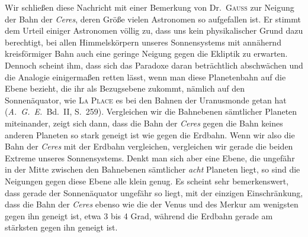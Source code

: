 %
Wir schließen diese Nachricht mit einer Bemerkung von Dr.\ \textsc{Gauss} zur Neigung der Bahn der \textit{Ceres}, deren Größe vielen Astronomen so aufgefallen ist. Er stimmt dem Urteil einiger Astronomen völlig zu, dass uns kein physikalischer Grund dazu berechtigt, bei allen Himmelskörpern unseres Sonnensystems mit annähernd kreisförmiger Bahn auch eine geringe Neigung gegen die Ekliptik zu erwarten. Dennoch scheint ihm, dass sich das Paradoxe daran beträchtlich abschwächen und die Analogie einigermaßen retten lässt, wenn man diese Planetenbahn auf die Ebene bezieht, die ihr als Bezugsebene zukommt, nämlich auf den Sonnenäquator, wie \textsc{La Place} es bei den Bahnen der Uranusmonde getan hat (\textit{A.\ G.\ E.}\ Bd.\ II, S.\ 259). Vergleichen wir die Bahnebenen sämtlicher Planeten miteinander, zeigt sich dann, dass die Bahn der \textit{Ceres} gegen die Bahn keines anderen Planeten so stark geneigt ist wie gegen die Erdbahn. Wenn wir also die Bahn der \textit{Ceres} mit der Erdbahn vergleichen, vergleichen wir gerade die beiden Extreme unseres Sonnensystems. Denkt man sich aber eine Ebene, die ungefähr in der Mitte zwischen den Bahnebenen sämtlicher \textit{acht} Planeten liegt, so sind die Neigungen gegen diese Ebene alle klein genug. Es scheint sehr bemerkenswert, dass gerade der Sonnenäquator ungefähr so liegt, mit der einzigen Einschränkung, dass die Bahn der \textit{Ceres} ebenso wie die der Venus und des Merkur am wenigsten gegen ihn geneigt ist, etwa 3 bis 4 Grad, während die Erdbahn gerade am stärksten gegen ihn geneigt ist.
\begin{flushright}\end{flushright}


